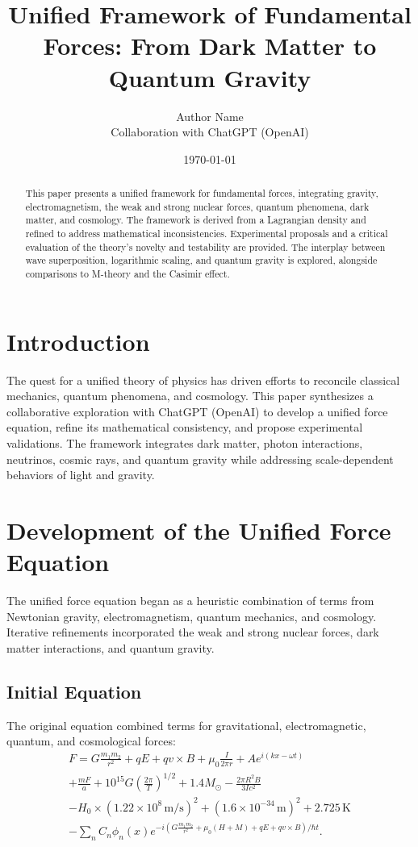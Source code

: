 \documentclass{article}
\title{Unified Framework of Fundamental Forces: From Dark Matter to Quantum Gravity}
\author{Author Name \\ Collaboration with ChatGPT (OpenAI)}
\date{\today}
\begin{document}
\maketitle

\begin{abstract}
This paper presents a unified framework for fundamental forces, integrating gravity, electromagnetism, the weak and strong nuclear forces, quantum phenomena, dark matter, and cosmology. The framework is derived from a Lagrangian density and refined to address mathematical inconsistencies. Experimental proposals and a critical evaluation of the theory's novelty and testability are provided. The interplay between wave superposition, logarithmic scaling, and quantum gravity is explored, alongside comparisons to M-theory and the Casimir effect.
\end{abstract}

\section{Introduction}
The quest for a unified theory of physics has driven efforts to reconcile classical mechanics, quantum phenomena, and cosmology. This paper synthesizes a collaborative exploration with ChatGPT (OpenAI) to develop a unified force equation, refine its mathematical consistency, and propose experimental validations. The framework integrates dark matter, photon interactions, neutrinos, cosmic rays, and quantum gravity while addressing scale-dependent behaviors of light and gravity.

\section{Development of the Unified Force Equation}
The unified force equation began as a heuristic combination of terms from Newtonian gravity, electromagnetism, quantum mechanics, and cosmology. Iterative refinements incorporated the weak and strong nuclear forces, dark matter interactions, and quantum gravity.

\subsection{Initial Equation}
The original equation combined terms for gravitational, electromagnetic, quantum, and cosmological forces:
\begin{multline*}
F = G\frac{m_1 m_2}{r^2} + qE + qv \times B + \mu_0 \frac{I}{2\pi r} + A e^{i(kx - \omega t)} \\
+ \frac{mF}{a} + 10^{15} G \left(\frac{2\pi}{T}\right)^{1/2} + 1.4 M_{\odot} - \frac{2\pi R^2 B}{3 I c^2} \\
- H_0 \times (1.22 \times 10^8 \, \text{m/s})^2 + (1.6 \times 10^{-34} \, \text{m})^2 + 2.725 \, \text{K} \\
- \sum_{n} C_n \phi_n(x) e^{-i\left(G\frac{m_1 m_2}{r^2} + \mu_0 (H + M) + qE + qv \times B\right)/\hbar t}.
\end{multline*}
\end{document}
